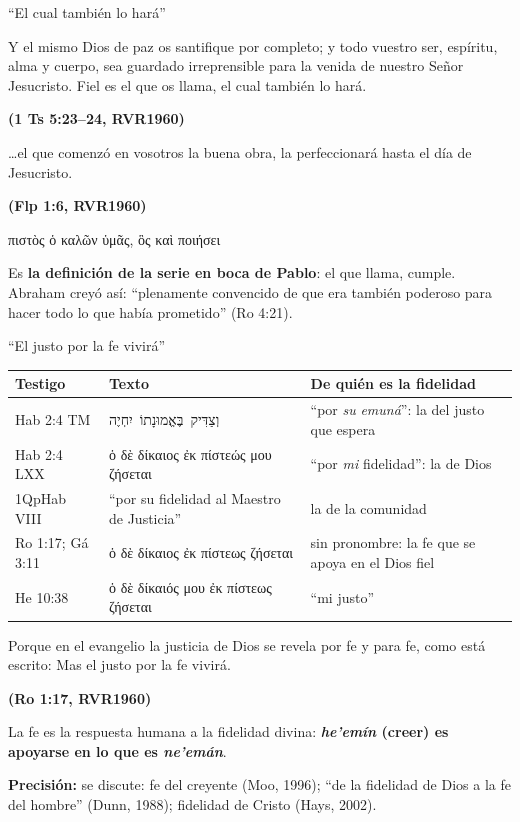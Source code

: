 \documentclass[hyperref={bookmarks=false},aspectratio=169]{beamer}
\newcommand{\heb}[1]{\mbox{\foreignlanguage{hebrew}{#1}}}
\newcommand{\grc}[1]{\foreignlanguage{ancientgreek}{#1}}
\newcommand{\fuente}[1]{\par\hfill{\upshape\bfseries\footnotesize\textcolor{azul}{#1}}}
\newcommand{\destacar}[1]{\textbf{\textcolor{azul}{#1}}}
\newcommand{\precision}[1]{{\footnotesize\color{gris}\textbf{Precisión:} #1}}
\begin{document}
\begin{frame}{``El cual también lo hará''}
\begin{cita}Y el mismo Dios de paz os santifique por completo; y todo vuestro ser, espíritu, alma y cuerpo, sea guardado irreprensible para la venida de nuestro Señor Jesucristo. Fiel es el que os llama, el cual también lo hará.\fuente{(1 Ts 5:23--24, RVR1960)}\end{cita}
\begin{cita}\ldots{}el que comenzó en vosotros la buena obra, la perfeccionará hasta el día de Jesucristo.\fuente{(Flp 1:6, RVR1960)}\end{cita}
\begin{center}
\grc{πιστὸς ὁ καλῶν ὑμᾶς, ὃς καὶ ποιήσει}
\end{center}
\small Es \destacar{la definición de la serie en boca de Pablo}: el que llama, cumple. Abraham creyó así: ``plenamente convencido de que era también poderoso para hacer todo lo que había prometido'' (Ro 4:21).
\end{frame}

\begin{frame}{``El justo por la fe vivirá''}
\scriptsize\renewcommand{\arraystretch}{1.15}
\begin{tabular}{@{}>{\RaggedRight\arraybackslash}p{2.0cm}>{\RaggedRight\arraybackslash}p{5.0cm}>{\RaggedRight\arraybackslash}p{4.8cm}@{}}
\toprule
\textbf{Testigo} & \textbf{Texto} & \textbf{De quién es la fidelidad} \\ \midrule
Hab 2:4 TM & \heb{וְצַדִּיק בֶּאֱמוּנָתוֹ יִחְיֶה} & ``por \emph{su} \emph{emuná}'': la del justo que espera \\
Hab 2:4 LXX & \grc{ὁ δὲ δίκαιος ἐκ πίστεώς μου ζήσεται} & ``por \emph{mi} fidelidad'': la de Dios \\
1QpHab VIII & ``por su fidelidad al Maestro de Justicia'' & la de la comunidad \\
Ro 1:17; Gá 3:11 & \grc{ὁ δὲ δίκαιος ἐκ πίστεως ζήσεται} & sin pronombre: la fe que se apoya en el Dios fiel \\
He 10:38 & \grc{ὁ δὲ δίκαιός μου ἐκ πίστεως ζήσεται} & ``mi justo'' \\
\bottomrule
\end{tabular}\par\medskip
\begin{cita}Porque en el evangelio la justicia de Dios se revela por fe y para fe, como está escrito: Mas el justo por la fe vivirá.\fuente{(Ro 1:17, RVR1960)}\end{cita}
\small La fe es la respuesta humana a la fidelidad divina: \destacar{\emph{he'emín} (creer) es apoyarse en lo que es \emph{ne'emán}}.\par
\precision{se discute: fe del creyente (Moo, 1996); ``de la fidelidad de Dios a la fe del hombre'' (Dunn, 1988); fidelidad de Cristo (Hays, 2002).}
\end{frame}
\end{document}
